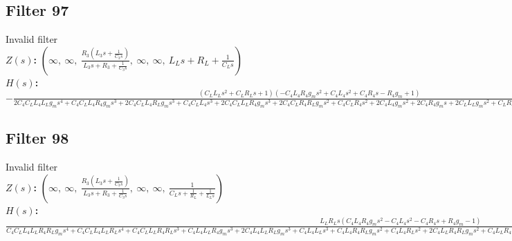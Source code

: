 \documentclass{article}
\begin{document}
\subsection*{Filter 97}
Invalid filter \\ 
\textbf{$Z(s)$:} $\left( \infty, \  \infty, \  \frac{R_{3} \left(L_{3} s + \frac{1}{C_{3} s}\right)}{L_{3} s + R_{3} + \frac{1}{C_{3} s}}, \  \infty, \  \infty, \  L_{L} s + R_{L} + \frac{1}{C_{L} s}\right)$ \\ 
\textbf{$H(s)$:} $- \frac{\left(C_{L} L_{L} s^{2} + C_{L} R_{L} s + 1\right) \left(- C_{4} L_{4} R_{4} g_{m} s^{2} + C_{4} L_{4} s^{2} + C_{4} R_{4} s - R_{4} g_{m} + 1\right)}{2 C_{4} C_{L} L_{4} L_{L} g_{m} s^{4} + C_{4} C_{L} L_{4} R_{4} g_{m} s^{3} + 2 C_{4} C_{L} L_{4} R_{L} g_{m} s^{3} + C_{4} C_{L} L_{4} s^{3} + 2 C_{4} C_{L} L_{L} R_{4} g_{m} s^{3} + 2 C_{4} C_{L} R_{4} R_{L} g_{m} s^{2} + C_{4} C_{L} R_{4} s^{2} + 2 C_{4} L_{4} g_{m} s^{2} + 2 C_{4} R_{4} g_{m} s + 2 C_{L} L_{L} g_{m} s^{2} + C_{L} R_{4} g_{m} s + 2 C_{L} R_{L} g_{m} s + C_{L} s + 2 g_{m}}$ \\ 
\subsection*{Filter 98}
Invalid filter \\ 
\textbf{$Z(s)$:} $\left( \infty, \  \infty, \  \frac{R_{3} \left(L_{3} s + \frac{1}{C_{3} s}\right)}{L_{3} s + R_{3} + \frac{1}{C_{3} s}}, \  \infty, \  \infty, \  \frac{1}{C_{L} s + \frac{1}{R_{L}} + \frac{1}{L_{L} s}}\right)$ \\ 
\textbf{$H(s)$:} $\frac{L_{L} R_{L} s \left(C_{4} L_{4} R_{4} g_{m} s^{2} - C_{4} L_{4} s^{2} - C_{4} R_{4} s + R_{4} g_{m} - 1\right)}{C_{4} C_{L} L_{4} L_{L} R_{4} R_{L} g_{m} s^{4} + C_{4} C_{L} L_{4} L_{L} R_{L} s^{4} + C_{4} C_{L} L_{L} R_{4} R_{L} s^{3} + C_{4} L_{4} L_{L} R_{4} g_{m} s^{3} + 2 C_{4} L_{4} L_{L} R_{L} g_{m} s^{3} + C_{4} L_{4} L_{L} s^{3} + C_{4} L_{4} R_{4} R_{L} g_{m} s^{2} + C_{4} L_{4} R_{L} s^{2} + 2 C_{4} L_{L} R_{4} R_{L} g_{m} s^{2} + C_{4} L_{L} R_{4} s^{2} + C_{4} R_{4} R_{L} s + C_{L} L_{L} R_{4} R_{L} g_{m} s^{2} + C_{L} L_{L} R_{L} s^{2} + L_{L} R_{4} g_{m} s + 2 L_{L} R_{L} g_{m} s + L_{L} s + R_{4} R_{L} g_{m} + R_{L}}$ \\ 
\end{document}
